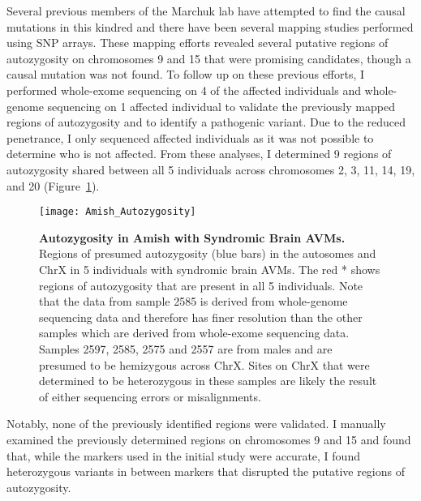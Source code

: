 Several previous members of the Marchuk lab have attempted to find the causal mutations in this kindred and there have been several mapping studies performed using SNP arrays. These mapping efforts revealed several putative regions of autozygosity on chromosomes 9 and 15 that were promising candidates, though a causal mutation was not found. To follow up on these previous efforts, I performed whole-exome sequencing on 4 of the affected individuals and whole-genome sequencing on 1 affected individual to validate the previously mapped regions of autozygosity and to identify a pathogenic variant. Due to the reduced penetrance, I only sequenced affected individuals as it was not possible to determine who is not affected. From these analyses, I determined 9 regions of autozygosity shared between all 5 individuals across chromosomes 2, 3, 11, 14, 19, and 20 (Figure~\ref{Amish_Autozygosity}).
\begin{figure}[tbp!]
\begin{center}
\texttt{[image: Amish\_Autozygosity]}
\end{center}
\caption[Autozygosity in Amish with Syndromic Brain AVMs]{\textbf{Autozygosity in Amish with Syndromic Brain AVMs.} \\ Regions of presumed autozygosity (blue bars) in the autosomes and ChrX in 5 individuals with syndromic brain AVMs. The red * shows regions of autozygosity that are present in all 5 individuals. Note that the data from sample 2585 is derived from whole-genome sequencing data and therefore has finer resolution than the other samples which are derived from whole-exome sequencing data. Samples 2597, 2585, 2575 and 2557 are from males and are presumed to be hemizygous across ChrX. Sites on ChrX that were determined to be heterozygous in these samples are likely the result of either sequencing errors or misalignments.}
\label{Amish_Autozygosity}
\end{figure}
 Notably, none of the previously identified regions were validated. I manually examined the previously determined regions on chromosomes 9 and 15 and found that, while the markers used in the initial study were accurate, I found heterozygous variants in between markers that disrupted the putative regions of autozygosity. 

